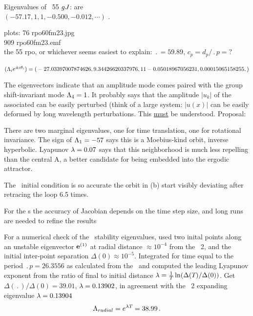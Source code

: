 Eigenvalues of \rpo\ {\nameit}55 $g{J}$: are
\\
$(-57.17,  1, 1, -0.500, -0.012, \cdots)$ .
%

plots:
  76 rpo60fm23.jpg	\\
 909 rpo60fm23.emf	\\
the 55 rpo, or whichever seems easiest to explain:
$\period{} = 59.89$,
$c_p = d_p/\period{p}= ?$

$(\Lambda_i e^{\pm i\theta_i})=
(
\\
 -27.03397007874626,
\\
   9.34426620337976,
\\
   1
\\
   1
\\
  -0.05018967056231,
\\
   0.00015065158255,
)$

The eigenvectors
indicate that an amplitude mode comes paired with the 
group shift-invariant mode $\Lambda_4 =1$. It probably says that
the amplitude $|u_k|$ of the associated can be easily perturbed (think of
a large system: $|u(x)|$ can be easily deformed by long wavelength
perturbations. This \underline{must} be understood. Proposal:

There are two
marginal eigenvalues, one for time translation, one for
rotational invariance. 
The sign of $\Lambda_{1}=-57$ says this is a Moebius-kind orbit,
inverse hyperbolic.
Lyapunov $\lambda=0.07$ says that this neighborhood is much less repelling than
the central {\eqv} A, a better candidate for being embedded into the
ergodic attractor.

The \rpo\ initial condition is
so accurate the orbit in (b)
start visibly deviating after retracing the loop 6.5 times.

For the \rpo s the accuracy of Jacobian depends
on the time step size, and long runs are needed to refine the results

For a numerical check of the \rpo\ stability eigenvalues,
used two inital
points along an unstable eigenvector ${\bf e}^{(1)}$
at radial distance  $\approx 10^{-4}$ from the \eqv\ {\nameit}2,
and the initial inter-point separation $\Delta(0) \approx 10^{-5}$.
Integrated for time equal to the period $\period{p}=26.3556$ as calculated from
the \jacobianM\ and computed the leading Lyapunov exponent from the ratio of
final to initial distance 
$\lambda= {1 \over {T_{}}}\ln( \Delta({T_{}})/\Delta(0))$.
Get
$\Delta(\period{})/\Delta(0) =39.01$,
$\lambda=0.13902$, in agreement with the \eqv\ {\nameit}2 
expanding eigenvalue $\lambda=0.13904$
\[
\Lambda_{radial} =  e^{\lambda {T_{}}} =38.99
\,.
\]

